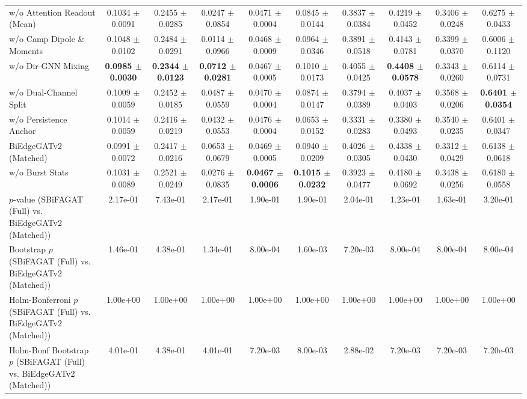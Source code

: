\begin{table}[t]
{\begin{tabular}{lccccccccc}
w/o Attention Readout (Mean) & 0.1034 $\pm$ 0.0091 & 0.2455 $\pm$ 0.0285 & 0.0247 $\pm$ 0.0854 & 0.0471 $\pm$ 0.0004 & 0.0845 $\pm$ 0.0144 & 0.3837 $\pm$ 0.0384 & 0.4219 $\pm$ 0.0452 & 0.3406 $\pm$ 0.0248 & 0.6275 $\pm$ 0.0433 \\
w/o Camp Dipole \& Moments & 0.1048 $\pm$ 0.0102 & 0.2484 $\pm$ 0.0291 & 0.0114 $\pm$ 0.0966 & 0.0468 $\pm$ 0.0009 & 0.0964 $\pm$ 0.0346 & 0.3891 $\pm$ 0.0518 & 0.4143 $\pm$ 0.0781 & 0.3399 $\pm$ 0.0370 & 0.6006 $\pm$ 0.1120 \\
w/o Dir-GNN Mixing & \textbf{0.0985 $\pm$ 0.0030} & \textbf{0.2344 $\pm$ 0.0123} & \textbf{0.0712 $\pm$ 0.0281} & 0.0467 $\pm$ 0.0005 & 0.1010 $\pm$ 0.0173 & 0.4055 $\pm$ 0.0425 & \textbf{0.4408 $\pm$ 0.0578} & 0.3343 $\pm$ 0.0260 & 0.6114 $\pm$ 0.0731 \\
w/o Dual-Channel Split & 0.1009 $\pm$ 0.0059 & 0.2452 $\pm$ 0.0185 & 0.0487 $\pm$ 0.0559 & 0.0470 $\pm$ 0.0004 & 0.0874 $\pm$ 0.0147 & 0.3794 $\pm$ 0.0389 & 0.4037 $\pm$ 0.0403 & 0.3568 $\pm$ 0.0206 & \textbf{0.6401 $\pm$ 0.0354} \\
w/o Persistence Anchor & 0.1014 $\pm$ 0.0059 & 0.2416 $\pm$ 0.0219 & 0.0432 $\pm$ 0.0553 & 0.0476 $\pm$ 0.0004 & 0.0653 $\pm$ 0.0152 & 0.3331 $\pm$ 0.0283 & 0.3380 $\pm$ 0.0493 & 0.3540 $\pm$ 0.0235 & 0.6401 $\pm$ 0.0347 \\
BiEdgeGATv2 (Matched) & 0.0991 $\pm$ 0.0072 & 0.2417 $\pm$ 0.0216 & 0.0653 $\pm$ 0.0679 & 0.0469 $\pm$ 0.0005 & 0.0940 $\pm$ 0.0209 & 0.4026 $\pm$ 0.0305 & 0.4338 $\pm$ 0.0430 & 0.3312 $\pm$ 0.0429 & 0.6138 $\pm$ 0.0618 \\
w/o Burst Stats & 0.1031 $\pm$ 0.0089 & 0.2521 $\pm$ 0.0249 & 0.0276 $\pm$ 0.0835 & \textbf{0.0467 $\pm$ 0.0006} & \textbf{0.1015 $\pm$ 0.0232} & 0.3923 $\pm$ 0.0477 & 0.4180 $\pm$ 0.0692 & 0.3438 $\pm$ 0.0256 & 0.6180 $\pm$ 0.0558 \\
\midrule
$p$-value (SBiFAGAT (Full) vs. BiEdgeGATv2 (Matched)) & 2.17e-01 & 7.43e-01 & 2.17e-01 & 1.90e-01 & 1.90e-01 & 2.04e-01 & 1.23e-01 & 1.63e-01 & 3.20e-01 \\
Bootstrap $p$ (SBiFAGAT (Full) vs. BiEdgeGATv2 (Matched)) & 1.46e-01 & 4.38e-01 & 1.34e-01 & 8.00e-04 & 1.60e-03 & 7.20e-03 & 8.00e-04 & 8.00e-04 & 8.00e-04 \\
Holm-Bonferroni $p$ (SBiFAGAT (Full) vs. BiEdgeGATv2 (Matched)) & 1.00e+00 & 1.00e+00 & 1.00e+00 & 1.00e+00 & 1.00e+00 & 1.00e+00 & 1.00e+00 & 1.00e+00 & 1.00e+00 \\
Holm-Bonf Bootstrap $p$ (SBiFAGAT (Full) vs. BiEdgeGATv2 (Matched)) & 4.01e-01 & 4.38e-01 & 4.01e-01 & 7.20e-03 & 8.00e-03 & 2.88e-02 & 7.20e-03 & 7.20e-03 & 7.20e-03 \\
\bottomrule
\end{tabular}
}
\end{table}
